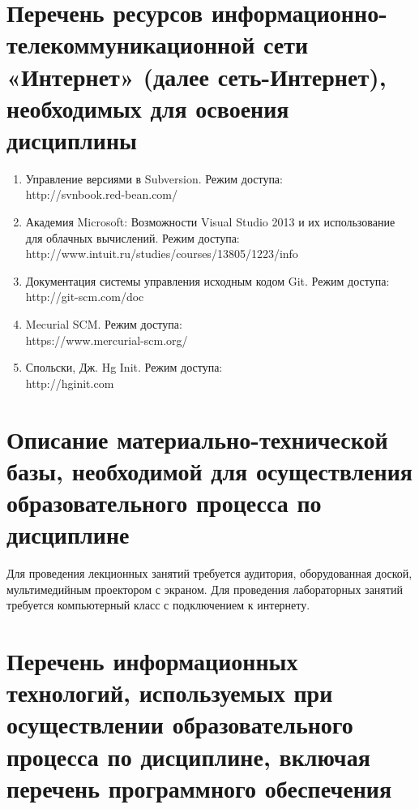 \documentclass[a4paper,12pt]{article}
\begin{document}
\section{Перечень ресурсов информационно-телекоммуникационной сети «Интернет» (далее сеть-Интернет), необходимых для освоения дисциплины}
\begin{enumerate}
  
  \item Управление версиями в Subversion. Режим доступа:\\ http://svnbook.red-bean.com/ 
  
  \item Академия Microsoft: Возможности Visual Studio 2013 и их использование для облачных вычислений. Режим доступа:\\ http://www.intuit.ru/studies/courses/13805/1223/info 
  
  \item Документация системы управления исходным кодом Git. Режим доступа:\\ http://git-scm.com/doc 
  
  \item Mecurial SCM. Режим доступа:\\ https://www.mercurial-scm.org/ 
  
  \item Спольски, Дж. Hg Init. Режим доступа:\\ http://hginit.com 
  
\end{enumerate}

\newpage
\section{Описание материально-технической базы, необходимой для осуществления образовательного процесса по дисциплине}
  
  
       Для проведения лекционных занятий требуется аудитория, оборудованная доской,  мультимедийным проектором с экраном. 
       Для проведения лабораторных занятий требуется компьютерный класс с подключением к интернету.
  
  


\section{Перечень информационных технологий, используемых при осуществлении образовательного процесса по дисциплине, включая перечень программного обеспечения
}
\end{document}
